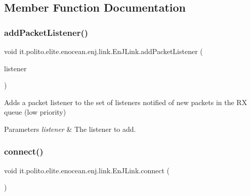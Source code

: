\subsection{Member Function Documentation}
\hypertarget{classit_1_1polito_1_1elite_1_1enocean_1_1enj_1_1link_1_1_en_j_link_aaf409c57f5237c5752695b7e149f2977}{}\label{classit_1_1polito_1_1elite_1_1enocean_1_1enj_1_1link_1_1_en_j_link_aaf409c57f5237c5752695b7e149f2977} 
\subsubsection{\texorpdfstring{add\+Packet\+Listener()}{addPacketListener()}}
{\footnotesize\ttfamily void it.\+polito.\+elite.\+enocean.\+enj.\+link.\+En\+J\+Link.\+add\+Packet\+Listener (\begin{DoxyParamCaption}\item[{\hyperlink{interfaceit_1_1polito_1_1elite_1_1enocean_1_1enj_1_1link_1_1_packet_listener}{Packet\+Listener}}]{listener }\end{DoxyParamCaption})}

Adds a packet listener to the set of listeners notified of new packets in the RX queue (low priority)


\begin{DoxyParams}{Parameters}
{\em listener} & The listener to add. \\
\hline
\end{DoxyParams}
\hypertarget{classit_1_1polito_1_1elite_1_1enocean_1_1enj_1_1link_1_1_en_j_link_a52e5159c6f16b7fb9f54ccb438f53215}{}\label{classit_1_1polito_1_1elite_1_1enocean_1_1enj_1_1link_1_1_en_j_link_a52e5159c6f16b7fb9f54ccb438f53215} 
\subsubsection{\texorpdfstring{connect()}{connect()}}
{\footnotesize\ttfamily void it.\+polito.\+elite.\+enocean.\+enj.\+link.\+En\+J\+Link.\+connect (\begin{DoxyParamCaption}{ }\end{DoxyParamCaption})}

